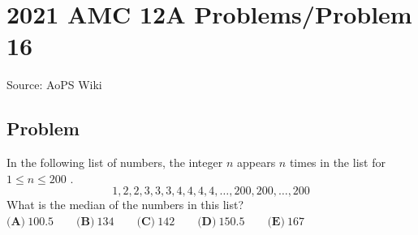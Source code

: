 \documentclass[12pt]{article}
\begin{document}
\section*{{2021 AMC 12A Problems/Problem 16}}
Source: AoPS Wiki

\subsection*{Problem}
In the following list of numbers, the integer $n$ appears $n$ times in the list for $1 \leq n \leq 200$ . \[1, 2, 2, 3, 3, 3, 4, 4, 4, 4, \ldots, 200, 200, \ldots , 200\] What is the median of the numbers in this list? $\textbf{(A)} ~100.5 \qquad\textbf{(B)} ~134 \qquad\textbf{(C)} ~142 \qquad\textbf{(D)} ~150.5 \qquad\textbf{(E)} ~167$
\end{document}

